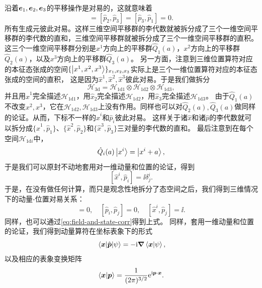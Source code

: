 沿着$\vb*{e}_1, \vb*{e}_2, \vb*{e}_3$的平移操作是对易的，这就意味着
\begin{equation}
    [\hat{p}_1, \hat{p}_2] = [\hat{p}_2, \hat{p}_3] = [\hat{p}_3, \hat{p}_1] = 0.
\end{equation}
所有生成元彼此对易。这样三维空间平移群的李代数就被拆分成了三个一维空间平移群的李代数的直和，三维空间平移群就被拆分成了三个一维空间平移群的直积。
这三个一维空间平移群分别是$x^1$方向上的平移群$\hat{Q}_1(a)$，$x^2$方向上的平移群$\hat{Q}_2(a)$，以及$x^3$方向上的平移群$\hat{Q}_3(a)$。
另一方面，注意到三维位置算符对应的本征态张成的空间$\{ \ket{x^1, x^2, x^3} \}_{x_1,x_2,x_3}$实际上是三个一维位置算符对应的本征态张成的空间的直积，
这是因为$\hat{x}^1, \hat{x}^2, \hat{x}^3$彼此对易。于是我们做拆分
\[
    \mathcal{H}_\text{3d} = \mathcal{H}_\text{1d1} \otimes \mathcal{H}_\text{1d2} \otimes \mathcal{H}_\text{1d3},
\]
并且用$\hat{x}^1$完全描述$\mathcal{H}_\text{1d1}$，用$\hat{x}_2$完全描述$\mathcal{H}_\text{1d2}$，用$\hat{x}_3$完全描述$\mathcal{H}_\text{1d3}$。
由于$\hat{Q}_1(a)$不改变$x^2, x^3$，它在$\mathcal{H}_\text{1d2},\mathcal{H}_\text{1d3}$上没有作用。同样也可以对$\hat{Q}_2(a),\hat{Q}_3(a)$做同样的论证。从而，下标不一样的$\hat{x}^i$和$\hat{p}_i$彼此对易。
这样关于诸$\hat{x}$和诸$\hat{p}$的李代数就可以拆分成$\{\hat{x}^1, \hat{p}_1\}$、$\{\hat{x}^2, \hat{p}_2\}$和$\{\hat{x}^3, \hat{p}_3\}$三对量的李代数的直和。
最后注意到在每个空间$\mathcal{H}_\text{1d$i$}$中，
\[
    \hat{Q}_i(a) \ket{x^i} = \ket{x^i + a},
\]
于是我们可以原封不动地套用对一维动量和位置的论证，得到
\[
    [\hat{x}^i, \hat{p}_i] = \ii \delta_{j}^i.
\]
于是，在没有做任何计算，而只是观念性地拆分了态空间之后，我们得到三维情况下的动量-位置对易关系：
\begin{equation}
    [\hat{x}^i, \hat{x}^j] = 0, \quad [\hat{p}_i, \hat{p}_j] = 0, \quad [\hat{x}^i, \hat{p}_j] = \ii .
\end{equation}
同样，也可以通过\eqref{eq:field-and-state-corr}得到上式。
同样，套用一维动量和位置的论证，我们得到动量算符在坐标表象下的形式
\begin{equation}
    \mel{\vb*{x}}{\hat{\vb*{p}}}{\psi} = - \mathrm{i} \grad{\braket{\vb*{x}}{\psi}},
    \label{eq:p-in-x-representation}
\end{equation}
以及相应的表象变换矩阵
\begin{equation}
    \braket{\vb*{x}}{\vb*{p}} = \frac{1}{(2\pi)^{3/2}} \mathrm{e}^{\mathrm{i} \vb*{p} \cdot \vb*{x}}.
    \label{eq:x-p-trans}
\end{equation}

